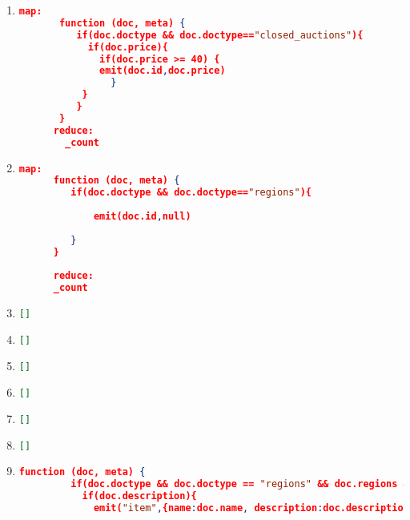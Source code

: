 \begin{enumerate}[label=Q\arabic*.]
	
    \item %
	\begin{lstlisting}[language=JSON, basicstyle=\scriptsize]
	map:
	   function (doc, meta) {
	      if(doc.doctype && doc.doctype=="closed_auctions"){
	        if(doc.price){
	          if(doc.price >= 40) {
	          emit(doc.id,doc.price)
	        	}
	       }
	      }
	   }
	  reduce: 
	    _count
	\end{lstlisting}
	
    \item %
	\begin{lstlisting}[language=JSON, basicstyle=\scriptsize]
	  map:
	  function (doc, meta) {
	     if(doc.doctype && doc.doctype=="regions"){
	      
	         emit(doc.id,null)
	      
	     }
	  }
	  
	  reduce: 
	  _count
	\end{lstlisting}
	
	
    \item %
	\begin{lstlisting}[language=JSON, basicstyle=\scriptsize]
	   []
	\end{lstlisting}
	
	
    \item %
	\begin{lstlisting}[language=JSON, basicstyle=\scriptsize]
	[]
	\end{lstlisting}
	
	
    \item %
	\begin{lstlisting}[language=JSON, basicstyle=\scriptsize]
	   []
	\end{lstlisting}
	
	
    \item %
	\begin{lstlisting}[language=JSON, basicstyle=\scriptsize]
	   []
	\end{lstlisting}
	
	
    \item %
	\begin{lstlisting}[language=JSON, basicstyle=\scriptsize]
		[]
	\end{lstlisting}
	
	
    \item %
	\begin{lstlisting}[language=JSON, basicstyle=\scriptsize]
	   []
	\end{lstlisting}
	
	
    \item %
	\begin{lstlisting}[language=JSON, basicstyle=\scriptsize]
	   function (doc, meta) {
	     if(doc.doctype && doc.doctype == "regions" && doc.regions && doc.regions=="australia"){
	       if(doc.description){
	         emit("item",{name:doc.name, description:doc.description})
	       

\end{lstlisting}
\end{enumerate}
